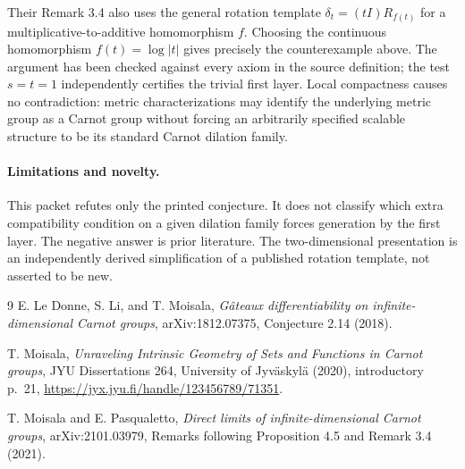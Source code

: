 \documentclass[11pt]{article}
\begin{document}
Their Remark 3.4 also uses the general rotation template
$\delta_t=(tI)R_{f(t)}$ for a multiplicative-to-additive homomorphism $f$.
Choosing the continuous homomorphism $f(t)=\log|t|$ gives precisely the
counterexample above.  The argument has been checked against every axiom in
the source definition; the test $s=t=1$ independently certifies the trivial
first layer.  Local compactness causes no contradiction: metric
characterizations may identify the underlying metric group as a Carnot group
without forcing an arbitrarily specified scalable structure to be its
standard Carnot dilation family.

\paragraph{Limitations and novelty.}
This packet refutes only the printed conjecture.  It does not classify which
extra compatibility condition on a given dilation family forces generation
by the first layer.  The negative answer is prior literature.  The
two-dimensional presentation is an independently derived simplification of a
published rotation template, not asserted to be new.

\begin{thebibliography}{9}
E. Le Donne, S. Li, and T. Moisala,
\emph{G\^ateaux differentiability on infinite-dimensional Carnot groups},
arXiv:1812.07375, Conjecture 2.14 (2018).

T. Moisala,
\emph{Unraveling Intrinsic Geometry of Sets and Functions in Carnot groups},
JYU Dissertations 264, University of Jyv\"askyl\"a (2020), introductory p.~21,
\url{https://jyx.jyu.fi/handle/123456789/71351}.

T. Moisala and E. Pasqualetto,
\emph{Direct limits of infinite-dimensional Carnot groups},
arXiv:2101.03979, Remarks following Proposition 4.5 and Remark 3.4 (2021).
\end{thebibliography}
\end{document}
